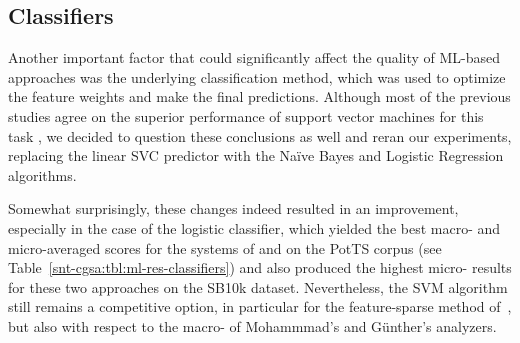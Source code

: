 \subsection{Classifiers}\label{subsec:cgsa:ml-methods:classifiers-analysis}

Another important factor that could significantly affect the quality
of ML-based approaches was the underlying classification method, which
was used to optimize the feature weights and make the final
predictions.  Although most of the previous studies agree on the
superior performance of support vector machines for this task
\cite[see ][]{Pang:02,Gamon:04,Mohammad:13}, we decided to question
these conclusions as well and reran our experiments, replacing the
linear SVC predictor with the Na\"ive Bayes and Logistic Regression
algorithms.

Somewhat surprisingly, these changes indeed resulted in an
improvement, especially in the case of the logistic classifier, which
yielded the best macro- and micro-averaged scores for the systems of
\citet{Mohammad:13} and \citet{Guenther:14} on the PotTS corpus (see
Table~\ref{snt-cgsa:tbl:ml-res-classifiers}) and also produced the
highest micro-\F{} results for these two approaches on the SB10k
dataset.  Nevertheless, the SVM algorithm still remains a competitive
option, in particular for the feature-sparse method
of~\citet{Gamon:04}, but also with respect to the macro-\F{} of
Mohammmad's and G\"unther's analyzers.

